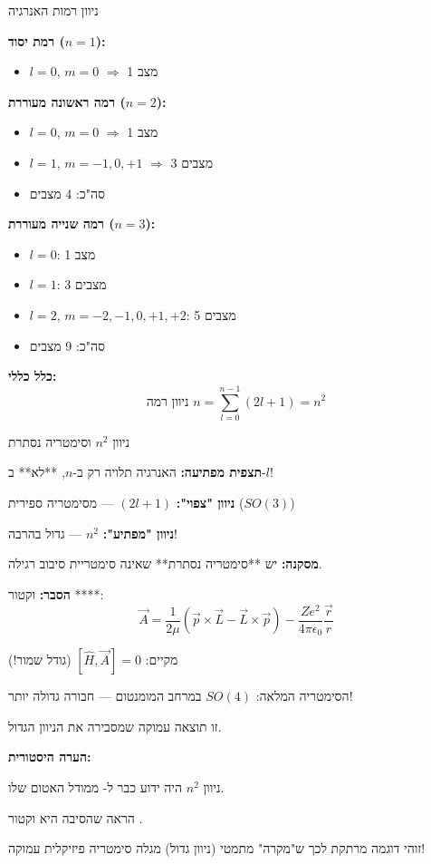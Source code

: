 \begin{examplebox}{ניוון רמות האנרגיה}

\textbf{רמת יסוד ($n=1$):}
\begin{itemize}
    \item $l=0$, $m=0$ $\Rightarrow$ 1 מצב
\end{itemize}

\textbf{רמה ראשונה מעוררת ($n=2$):}
\begin{itemize}
    \item $l=0$, $m=0$ $\Rightarrow$ 1 מצב
    \item $l=1$, $m=-1,0,+1$ $\Rightarrow$ 3 מצבים
    \item סה"כ: 4 מצבים
\end{itemize}

\textbf{רמה שנייה מעוררת ($n=3$):}
\begin{itemize}
    \item $l=0$: 1 מצב
    \item $l=1$: 3 מצבים
    \item $l=2$, $m=-2,-1,0,+1,+2$: 5 מצבים
    \item סה"כ: 9 מצבים
\end{itemize}

\textbf{כלל כללי:}
\[
\text{ניוון רמה } n = \sum_{l=0}^{n-1} (2l+1) = n^2
\]
\end{examplebox}

\begin{theorembox}{ניוון $n^2$ וסימטריה נסתרת}

\textbf{תצפית מפתיעה:} האנרגיה תלויה רק ב-$n$, **לא** ב-$l$!

\textbf{ניוון "צפוי":} $(2l+1)$ — מסימטריה ספירית ($SO(3)$)

\textbf{ניוון "מפתיע":} $n^2$ — גדול בהרבה!

\textbf{מסקנה:} יש **סימטריה נסתרת** שאינה סימטריית סיבוב רגילה.

\textbf{הסבר:} וקטור ****:
\[
\vec{A} = \frac{1}{2\mu}\left(\vec{p} \times \vec{L} - \vec{L} \times \vec{p}\right) - \frac{Ze^2}{4\pi\epsilon_0}\frac{\vec{r}}{r}
\]

מקיים: $[\hat{H}, \vec{A}] = 0$ (גודל שמור!)

הסימטריה המלאה: $SO(4)$ במרחב המומנטום — חבורה גדולה יותר!

זו תוצאה עמוקה שמסבירה את הניוון הגדול.
\end{theorembox}

\begin{notebox}
\textbf{הערה היסטורית:}

ניוון $n^2$ היה ידוע כבר ל- ממודל האטום שלו.

 הראה שהסיבה היא וקטור .

זוהי דוגמה מרתקת לכך ש"מקרה" מתמטי (ניוון גדול) מגלה סימטריה פיזיקלית עמוקה!
\end{notebox}

